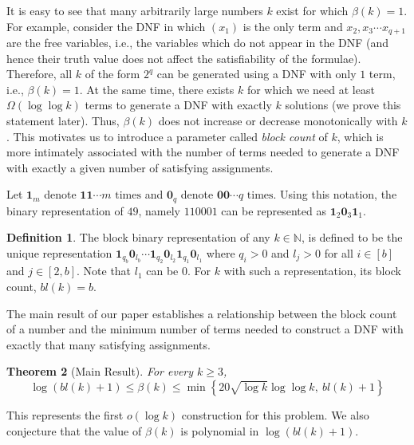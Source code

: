 \documentclass[11pt,a4paper]{article}
\newtheorem{theorem}{Theorem}[section]
\theoremstyle{definition}
\newtheorem{definition}[theorem]{Definition}
\begin{document}
It is easy to see that many arbitrarily large numbers $k$ exist for 
which $\beta(k)=1$. For example, consider the DNF in which $(x_1)$ is 
the only term and $x_2,x_3\cdots x_{q+1}$ are the free variables, i.e., 
the variables which do not appear in the DNF (and hence their truth 
value does not affect the satisfiability of the formulae). Therefore, 
all $k$ of the form $2^q$ can be generated using a DNF with only $1$ 
term, i.e., $\beta(k)=1$. At the same time, there exists $k$ for which 
we need at least $\Omega(\log\log{k})$ terms to generate a DNF with 
exactly $k$ solutions (we prove this statement later). Thus, $\beta(k)$ 
does not increase or decrease monotonically with $k$. This motivates us 
to introduce a parameter called \textit{block count} of $k$, which is 
more intimately associated with the number of terms needed to generate 
a DNF with exactly a given number of satisfying assignments.

Let $\mathbf{1}_m$ denote $\mathbf{1}\mathbf{1}\cdots m \text{ times}$ 
and $\mathbf{0}_q$ denote $\mathbf{0}\mathbf{0}\cdots q \text{ times}$. 
Using this notation, the binary representation of $49$, namely $110001$ 
can be represented as $\mathbf{1}_2\mathbf{0}_3\mathbf{1}_1$.

\begin{definition}
	The block binary representation of any $k\in \mathbb{N}$, is defined to 
	be the unique representation $\mathbf{1}_{q_b} \mathbf{0}_{l_b}\cdots 
	\mathbf{1}_{q_2}\mathbf{0}_{l_2} \mathbf{1}_{q_1} \mathbf{0}_{l_1}$ 
	where $q_i> 0$ and $l_j> 0$ for all $i\in [b]$ and $j \in [2,b]$. Note 
	that $l_1$ can be $0$. For $k$ with such a representation, its block 
	count, $bl(k)=b$.
\end{definition}

The main result of our paper establishes a relationship between the 
block count of a number and the minimum number of terms needed to 
construct a DNF with exactly that many satisfying assignments.


\begin{theorem}[Main Result]\label{thm:sqrt_bnd}
	For every $k\geq 3$,  $$\log{(bl(k)+1)} \leq  \beta(k) \leq \min\left\{ 20\sqrt{\log{k}} \log\log{k},\ {bl}(k) + 1 \right\}$$
\end{theorem}

%

This represents the first $o(\log{k})$ construction for this problem. 
We also conjecture that the value of $\beta(k)$ is polynomial in 
$\log{(bl(k)+1)}$.
\end{document}
